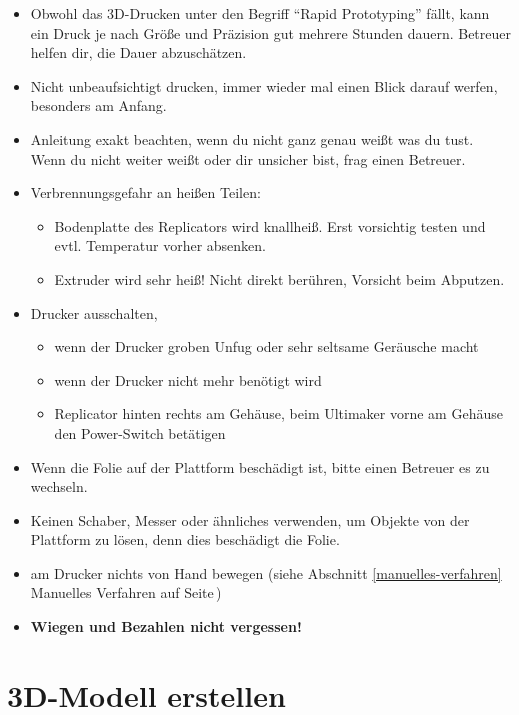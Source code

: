 \documentclass{\basedir/fablab-document}
\begin{document}
\begin{itemize}
 \item Obwohl das 3D-Drucken unter den Begriff ``Rapid Prototyping'' fällt, kann ein Druck je nach Größe und 
 Präzision gut mehrere Stunden dauern. Betreuer helfen dir, die Dauer abzuschätzen. 
 \item Nicht unbeaufsichtigt drucken, immer wieder mal einen Blick darauf werfen, besonders am Anfang. 
 \item Anleitung exakt beachten, wenn du nicht ganz genau weißt was du tust.\\ Wenn du nicht weiter weißt oder dir unsicher bist, frag einen Betreuer.
 \item Verbrennungsgefahr an heißen Teilen:
  \begin{itemize}
   \item Bodenplatte des Replicators wird knallheiß. Erst vorsichtig testen und evtl. Temperatur vorher absenken.
   \item Extruder wird sehr heiß! Nicht direkt berühren, Vorsicht beim Abputzen.
  \end{itemize}
 \item Drucker ausschalten,
 \begin{itemize}
  \item wenn der Drucker groben Unfug oder sehr seltsame Geräusche macht
  \item wenn der Drucker nicht mehr benötigt wird
  \item Replicator hinten rechts am Gehäuse, beim Ultimaker vorne am Gehäuse den Power-Switch betätigen
 \end{itemize}
 \item Wenn die Folie auf der Plattform beschädigt ist, bitte einen Betreuer es zu wechseln.
 \item Keinen Schaber, Messer oder ähnliches verwenden, um Objekte von der Plattform zu lösen, denn dies beschädigt die Folie.
 \item am Drucker nichts von Hand bewegen (siehe Abschnitt \ref{manuelles-verfahren} Manuelles Verfahren auf Seite\,\pageref{manuelles-verfahren})
 \item \textbf{Wiegen und Bezahlen nicht vergessen!}
\end{itemize}
\newpage
\renewcommand{\contentsname}{Inhaltsverzeichnis / Arbeitsablauf}
\setcounter{tocdepth}{2}
\tableofcontents

\newpage

\section{3D-Modell erstellen}
\end{document}
